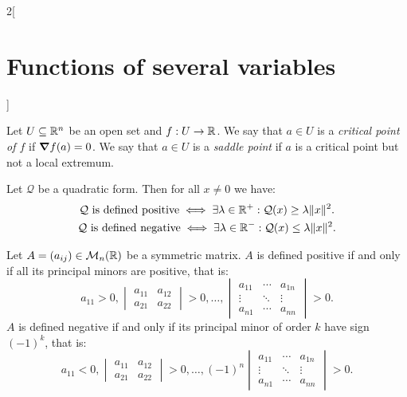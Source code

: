 \documentclass[../../../main.tex]{subfiles}
\begin{document}
\begin{multicols}{2}[\section{Functions of several variables}]
\begin{prop}
    \end{prop}
    \begin{definition}
        Let $U\subseteq\mathbb{R}^n$ be an open set and $f:U\rightarrow\mathbb{R} $. We say that $a\in U$ is a \textit{critical point of $f$} if $\grad f(a)=0$. We say that $a\in U$ is a \textit{saddle point} if $a$ is a critical point but not a local extremum.
    \end{definition}
    \begin{theorem}
        Let $\mathcal{Q}$ be a quadratic form. Then for all $x\ne 0$ we have:
        \begin{gather*}
            \mathcal{Q}\text{ is defined positive}\iff\exists\lambda\in\mathbb{R}^+:\mathcal{Q}(x)\geq\lambda\|x\|^2.\\
            \mathcal{Q}\text{ is defined negative}\iff\exists\lambda\in\mathbb{R}^-:\mathcal{Q}(x)\leq\lambda\|x\|^2.
        \end{gather*}
    \end{theorem}
    \begin{prop}
        Let $A=(a_{ij})\in\mathcal{M}_n(\mathbb{R} )$ be a symmetric matrix. $A$ is defined positive if and only if all its principal minors are positive, that is: $$a_{11}>0,\begin{vmatrix}
                a_{11} & a_{12} \\
                a_{21} & a_{22}\end{vmatrix}>0,\ldots,
            \begin{vmatrix}
                a_{11} & \cdots & a_{1n} \\
                \vdots & \ddots & \vdots \\
                a_{n1} & \cdots & a_{nn}
            \end{vmatrix}>0.$$ $A$ is defined negative if and only if its principal minor of order $k$ have sign $(-1)^k$, that is: $$a_{11}<0,
            \begin{vmatrix}
                a_{11} & a_{12} \\
                a_{21} & a_{22}
            \end{vmatrix}>0,\ldots,
            (-1)^n\begin{vmatrix}
                a_{11} & \cdots & a_{1n} \\
                \vdots & \ddots & \vdots \\
                a_{n1} & \cdots & a_{nn}
            \end{vmatrix}>0.$$
    \end{prop}

\end{multicols}
\end{document}
